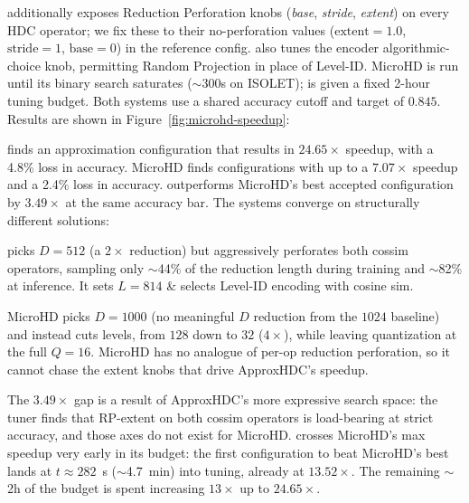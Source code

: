 \pname{} additionally exposes Reduction Perforation knobs (\textit{base}, \textit{stride}, \textit{extent}) on every HDC operator; we fix these to their no-perforation values ($\text{extent}{=}1.0$, $\text{stride}{=}1$, $\text{base}{=}0$) in the reference config. \pname{} also tunes the encoder algorithmic-choice knob, permitting Random Projection in place of Level-ID. MicroHD is run until its binary search saturates ($\sim$300s on ISOLET); \pname{} is given a fixed 2-hour tuning budget. Both systems use a shared accuracy cutoff and target of $0.845$. Results are shown in Figure~\ref{fig:microhd-speedup}:

\pname{} finds an approximation configuration that results in $24.65\times$ speedup, with a 4.8\% loss in accuracy. MicroHD finds configurations with up to a $7.07\times$ speedup and a 2.4\% loss in accuracy. \pname{} outperforms MicroHD's best accepted configuration by $3.49\times$ at the same accuracy bar. The systems converge on structurally different solutions:

\pname{} picks $D{=}512$ (a $2\times$ reduction) but aggressively perforates both cossim operators, sampling only $\sim$44\% of the reduction length during training and $\sim$82\% at inference. It sets $L{=}814$ \& selects Level-ID encoding with cosine sim. 


MicroHD picks $D{=}1000$ (no meaningful $D$ reduction from the $1024$ baseline) and instead cuts levels, from $128$ down to $32$ ($4\times$), while leaving quantization at the full $Q{=}16$. MicroHD has no analogue of per-op reduction perforation, so it cannot chase the extent knobs that drive ApproxHDC's speedup.

The $3.49\times$ gap is a result of ApproxHDC's more expressive search space: the tuner finds that RP-extent on both cossim operators is load-bearing at strict accuracy, and those axes do not exist for MicroHD. \pname{} crosses MicroHD's max speedup very early in its budget: the first \pname{} configuration to beat MicroHD's best lands at $t{\approx}282$~s ($\sim$4.7~min) into tuning, already at $13.52\times$. The remaining $\sim$2h of the \pname{} budget is spent increasing $13\times$ up to $24.65\times$.

